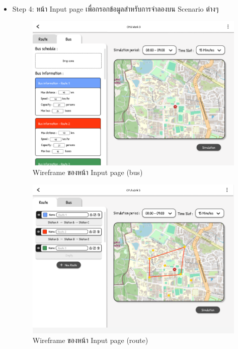 \begin{mypara}
\begin{itemize}
\begin{itemize}
    \end{itemize}

    \item Step 4: หน้า Input page เพื่อกรอกข้อมูลสำหรับการจำลองบน Scenario ต่างๆ
      \begin{figure}[H]
        \centering 
        \includegraphics[scale=0.4]{input_bus.png}
        \caption{Wireframe ของหน้า Input page (bus) }
        \label{fig:WireframeInputLogin}
      \end{figure}

      \begin{figure}[H]
        \centering
        \includegraphics[scale=0.4]{input_route.png}
        \caption{Wireframe ของหน้า Input page (route) }
        \label{fig:WireframeInputRouteLogin}
      \end{figure}


\end{itemize}
\end{mypara}
